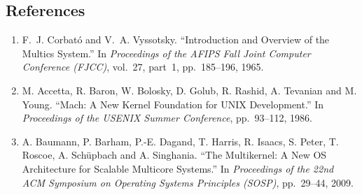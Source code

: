 \subsection*{References}
\label{p4:sec:refs}

\begin{enumerate}
  \item[{[1]}] F.~J. Corbat\'o and V.~A. Vyssotsky. ``Introduction and Overview of the
    Multics System.'' In \emph{Proceedings of the AFIPS Fall Joint Computer Conference
    (FJCC)}, vol.~27, part~1, pp.~185--196, 1965.
  \item[{[2]}] M. Accetta, R. Baron, W. Bolosky, D. Golub, R. Rashid, A. Tevanian and
    M. Young. ``Mach: A New Kernel Foundation for UNIX Development.'' In \emph{Proceedings
    of the USENIX Summer Conference}, pp.~93--112, 1986.
  \item[{[3]}] A. Baumann, P. Barham, P.-E. Dagand, T. Harris, R. Isaacs, S. Peter,
    T. Roscoe, A. Sch\"upbach and A. Singhania. ``The Multikernel: A New OS Architecture for
    Scalable Multicore Systems.'' In \emph{Proceedings of the 22nd ACM Symposium on Operating
    Systems Principles (SOSP)}, pp.~29--44, 2009.
\end{enumerate}
